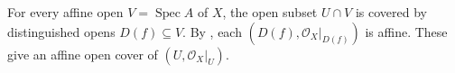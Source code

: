 For every affine open $V=\operatorname{Spec}A$ of $X$, the open subset $U\cap V$ is covered by distinguished opens $D(f)\subseteq V$. By , each $(D(f),\mathcal O_X|_{D(f)})$ is affine. These give an affine open cover of $(U,\mathcal O_X|_U)$.
